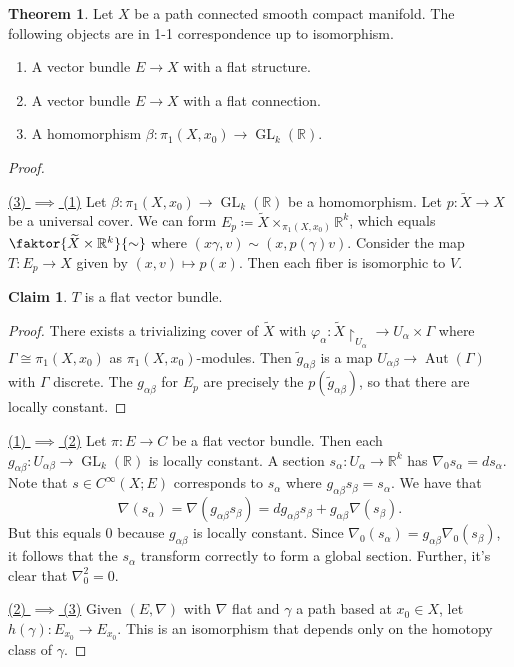 \documentclass[10pt,letterpaper,cm]{nupset}
\theoremstyle{definition}
\theoremstyle{theorem}
\newtheorem{theorem}[definition]{Theorem}
\newtheorem*{claim}{Claim}
\theoremstyle{remark}
\newcommand{\R}{\mathbb{R}}
\newcommand{\1}{\mathbb{1}}
\newcommand{\0}{\vec 0}
\DeclareMathOperator{\GL}{GL}
\DeclareMathOperator{\aut}{Aut}
\begin{document}
\begin{theorem}
Let $X$ be a path connected smooth compact manifold. The following objects are in 1-1 correspondence up to isomorphism.
\begin{enumerate}[label=(\arabic*)]
\item A vector bundle $E \to X$ with a flat structure.
\item A vector bundle $E \to X$ with a flat connection.
\item A homomorphism $\beta : \pi_1\left(X, x_0\right) \to \GL_k(\R)$.
\end{enumerate}
\end{theorem}
\begin{proof} $ $
\smallskip

\underline{(3) $\implies$ (1)} Let $\beta : \pi_1\left(X, x_0\right) \to \GL_k(\R)$ be a homomorphism. Let $p : \widetilde{X} \to X$ be a universal cover. We can form $E_p \coloneqq  \widetilde{X} \times_{\pi_1\left(X, x_0\right)} \R^k$, which equals $\faktor{\widetilde{X} \times \R^k}{\sim}$ where $\left(x{\gamma}, v\right) \sim \left(x, p(\gamma)v\right)$.  Consider the map $T: E_p \to X$ given by $\left(x,v\right) \mapsto p(x)$. Then each fiber is isomorphic to $V$.
\begin{claim}
$T$ is a flat vector bundle.
\end{claim}
\begin{proof}
There exists a trivializing cover of $\widetilde{X}$ with $\varphi_{\alpha} : \widetilde{X}\restriction_{U_{\alpha}} \to U_{\alpha} \times \Gamma$ where $\Gamma \cong \pi_1\left(X, x_0\right)$ as $\pi_1\left(X, x_0\right)$-modules. Then $\tilde{g}_{\alpha{\beta}}$ is a map $U_{\alpha{\beta}} \to \aut(\Gamma)$ with $\Gamma$ discrete. The $g_{\alpha{\beta}}$ for $E_p$ are precisely the $p(\tilde{g}_{\alpha{\beta}})$, so that there are locally constant. 
\end{proof}
\underline{(1) $\implies$ (2)} Let $\pi : E \to C$ be a flat vector bundle. Then each $g_{\alpha{\beta}} : U_{\alpha{\beta}} \to \GL_k(\R)$  is locally constant. A section  $s_{\alpha} : U_{\alpha} \to \R^k$ has $\nabla_0{s_{\alpha}} = ds_{\alpha}$. Note that $s \in C^{\infty}(X; E)$ corresponds to $s_{\alpha}$ where $g_{\alpha{\beta}}s_{\beta} = s_{\alpha}$. We have that $$ \nabla(s_{\alpha}) = \nabla(g_{\alpha{\beta}}s_{\beta}) = dg_{\alpha{\beta}} s_{\beta} + g_{\alpha{\beta}}\nabla(s_{\beta})    .$$ But this equals $0$ because $g_{\alpha{\beta}}$ is locally constant. Since $\nabla_0(s_{\alpha}) = g_{\alpha{\beta}} \nabla_0(s_{\beta})$, it follows that the $s_{\alpha}$  transform correctly to form a global section. Further, it's clear that $\nabla_0^2 =0$. 

\underline{(2) $\implies$ (3)} Given $\left(E, \nabla\right)$ with $\nabla$ flat and $\gamma$ a path based at $x_0 \in X$, let $h(\gamma) : E_{x_0} \to E_{x_0}$. This is an isomorphism that depends only on the homotopy class of $\gamma$.
\end{proof}
\end{document}
